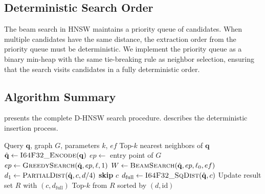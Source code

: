 \documentclass[10pt,journal,compsoc]{IEEEtran}
\newcommand{\dhnsw}{\textsc{D-HNSW}}
\newcommand{\hnsw}{\textsc{HNSW}}
\begin{document}
\subsection{Deterministic Search Order}

The beam search in \hnsw{} maintains a priority queue of candidates. When multiple candidates have the same distance, the extraction order from the priority queue must be deterministic. We implement the priority queue as a binary min-heap with the same tie-breaking rule as neighbor selection, ensuring that the search visits candidates in a fully deterministic order.

\subsection{Algorithm Summary}

 presents the complete \dhnsw{} search procedure.  describes the deterministic insertion process.

\begin{algorithm}[t]
  \caption{\dhnsw{} Deterministic Search}
  \label{alg:dhnsw_search}
  \begin{algorithmic}[1]
    \REQUIRE Query $\mathbf{q}$, graph $G$, parameters $k$, $ef$
    \ENSURE Top-$k$ nearest neighbors of $\mathbf{q}$
    \STATE $\hat{\mathbf{q}} \leftarrow \textsc{I64F32\_Encode}(\mathbf{q})$
    \STATE $ep \leftarrow$ entry point of $G$
      \STATE $ep \leftarrow \textsc{GreedySearch}(\hat{\mathbf{q}}, ep, \ell, 1)$
    \ENDFOR
    \STATE $W \leftarrow \textsc{BeamSearch}(\hat{\mathbf{q}}, ep, \ell_0, ef)$
      \STATE $d_1 \leftarrow \textsc{PartialDist}(\hat{\mathbf{q}}, c, d/4)$
        \STATE \textbf{skip} $c$ 
      \ELSE
        \STATE $d_{\text{full}} \leftarrow \textsc{I64F32\_SqDist}(\hat{\mathbf{q}}, c)$
        \STATE Update result set $R$ with $(c, d_{\text{full}})$
      \ENDIF
    \ENDFOR
    \RETURN Top-$k$ from $R$ sorted by $(d, \text{id})$
  \end{algorithmic}
\end{algorithm}
\end{document}
